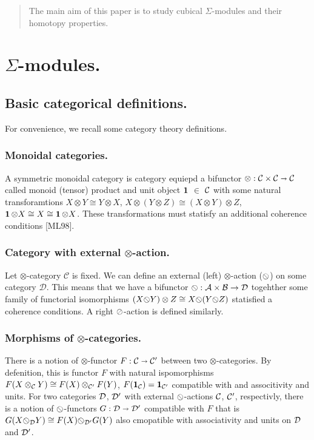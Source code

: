 



\maketitle

\begin{abstract}
	The main aim of this paper is to study cubical $\Sigma$-modules and their homotopy properties.
\end{abstract}

\tableofcontents

\newpage
\section{$\Sigma$-modules.}
\label{sec:orgb22ab46}

	\subsection{Basic categorical definitions.}
    For convenience, we recall some category theory definitions.
		\subsubsection{Monoidal categories.}
		A symmetric monoidal category is category equiepd a bifunctor $\otimes : \mathcal{C} \times \mathcal{C} \shortrightarrow \mathcal{C}$ called monoid (tensor) product and unit object $\operatorname*{\textbf{1}}$ $\in$ $\mathcal{C}$
		with some natural transforamtions $ X \otimes Y  \cong Y \otimes X $, 
		$ X \otimes (Y \otimes Z) \cong (X \otimes Y) \otimes Z $, 
		$ \operatorname*{\textbf{1}} \otimes X \cong X \cong \operatorname*{\textbf{1}} \otimes X $.
		These transformations must statisfy an additional coherence conditions [ML98].
		\subsubsection{Category with external $\otimes$-action.}
		Let $\otimes$-category $\mathcal{C}$ is fixed. We can define an external (left) $\otimes$-action 
		($\rosl$) on some category $\mathcal{D}$. This means that we have a bifunctor 
		$ \rosl : \mathcal{A} \times \mathcal{B} \to \mathcal{D} $ togehther some family of functorial
		isomorphisms $ (X \rosl Y) \otimes Z \cong X \rosl (Y \rosl Z) $ statisfied a coherence conditions.
		A right $\oslash$-action is defined similarly.
		\subsubsection{Morphisms of $\otimes$-categories.}
		There is a notion of $\otimes$-functor $ F : \mathcal{C} \shortrightarrow \mathcal{C'} $ between two $\otimes$-categories.
		By defenition, this is functor $F$ with natural ispomorphisms $ F(X \otimes_\mathcal{C} Y)  \cong F(X) \otimes_\mathcal{C'} F(Y) $, 
		$ F(\operatorname*{\textbf{1}}_{\mathcal{C}}) = \operatorname*{\textbf{1}}_\mathcal{C'} $ compatible with and associtivity and units. \newline
		For two categories $ \mathcal{D} $, $ \mathcal{D'} $ with external $ \rosl $-actions $ \mathcal{C} $, $ \mathcal{C'} $, respectivly, there is
		a notion of $\rosl$-functors $ G: \mathcal{D} \shortrightarrow \mathcal{D'} $ compatible with $F$ that is 
		$ G(X \rosl_\mc{D} Y) \cong F(X) \rosl_\mc{D'} G(Y) $ also cmopatible with associativity and units on
		$\mathcal{D}$ and $\mathcal{D'}$.
